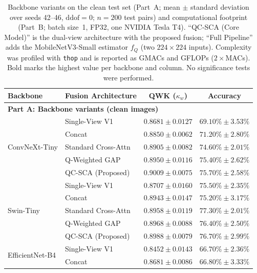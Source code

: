 \documentclass[final,5p,times,twocolumn,authoryear]{elsarticle}
\newcommand{\qcsca}{QC-SCA}
\theoremstyle{plain}
\theoremstyle{remark}
\begin{document}
\begin{table}[!tb]
\centering
\renewcommand{\arraystretch}{0.7}
\caption{Backbone variants on the clean test set (Part~A; mean $\pm$ standard deviation over seeds 42--46, $\text{ddof}=0$; $n=200$ test pairs) and computational footprint (Part~B; batch size~1, FP32, one NVIDIA Tesla T4). ``\qcsca{} (Core Model)'' is the dual-view architecture with the proposed fusion; ``Full Pipeline'' adds the MobileNetV3-Small estimator $f_Q$ (two $224\times224$ inputs). Complexity was profiled with \texttt{thop} and is reported as GMACs and GFLOPs ($2\times$MACs). Bold marks the highest value per backbone and column. No significance tests were performed.}
\label{tab:backbone_cost}
\footnotesize
\setlength{\tabcolsep}{4pt}
\begin{tabular}{llcc}
\toprule
Backbone & Fusion Architecture & QWK ($\kappa_w$) & Accuracy \\
\midrule
\multicolumn{4}{l}{\textbf{Part A: Backbone variants (clean images)}} \\
\multirow{5}{*}{ConvNeXt-Tiny \citep{Liu2022convnext}}
  & Single-View V1        & $0.8681 \pm 0.0127$ & $69.10\% \pm 3.53\%$ \\
  & Concat                & $0.8850 \pm 0.0062$ & $71.20\% \pm 2.80\%$ \\
  & Standard Cross-Attn   & $0.8905 \pm 0.0082$ & $74.60\% \pm 2.01\%$ \\
  & Q-Weighted GAP        & $0.8950 \pm 0.0116$ & $75.40\% \pm 2.62\%$ \\
  & \qcsca{} (Proposed)   & $\mathbf{0.9009 \pm 0.0075}$ & $\mathbf{75.70\% \pm 2.58\%}$ \\
\midrule
\multirow{5}{*}{Swin-Tiny \citep{Liu2021swin}}
  & Single-View V1        & $0.8707 \pm 0.0160$ & $75.50\% \pm 2.35\%$ \\
  & Concat                & $0.8943 \pm 0.0147$ & $75.20\% \pm 3.17\%$ \\
  & Standard Cross-Attn   & $0.8958 \pm 0.0119$ & $\mathbf{77.30\% \pm 2.01\%}$ \\
  & Q-Weighted GAP        & $0.8968 \pm 0.0088$ & $76.40\% \pm 2.50\%$ \\
  & \qcsca{} (Proposed)   & $\mathbf{0.8988 \pm 0.0079}$ & $76.70\% \pm 2.99\%$ \\
\midrule
\multirow{5}{*}{EfficientNet-B4 \citep{Tan2019efficientnet}}
  & Single-View V1        & $0.8452 \pm 0.0143$ & $66.70\% \pm 2.36\%$ \\
  & Concat                & $0.8681 \pm 0.0086$ & $66.80\% \pm 3.33\%$ \\

\end{tabular}
\end{table}
\end{document}
